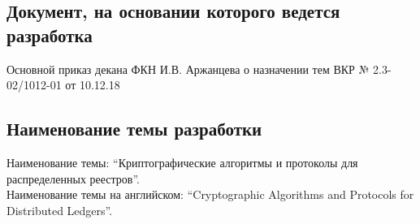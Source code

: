 \subsection{Документ, на основании которого ведется разработка}
Основной приказ декана ФКН И.В. Аржанцева о назначении тем ВКР
\textnumero № 2.3-02/1012-01 от 10.12.18

\subsection{Наименование темы разработки}
Наименование темы: ``Криптографические алгоритмы и протоколы для распределенных реестров''. \\
Наименование темы на английском: ``Cryptographic Algorithms and Protocols for Distributed Ledgers''.
